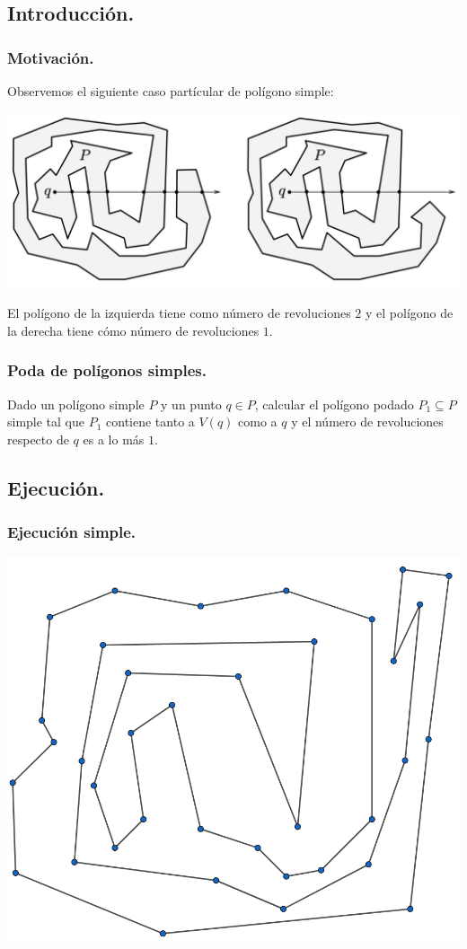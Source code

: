 \subsection{Introducción.}
\begin{frame}
  \frametitle{Motivación.}
  Observemos el siguiente caso partícular de polígono simple:
  
  \begin{center} \includegraphics[width=0.55 \paperwidth]{images/Revoluciones.png} \end{center}

  El polígono de la izquierda tiene como número de revoluciones $2$ y el polígono
  de la derecha tiene cómo número de revoluciones $1$.
\end{frame}

\begin{frame}
  \frametitle{Poda de polígonos simples.}
  Dado un polígono simple $P$ y un punto $q \in P$, calcular el polígono podado $P_1 \subseteq P$
  simple tal que $P_1$ contiene tanto a $V(q)$ como a $q$ y el número de revoluciones respecto de
  $q$ es a lo más $1$.  
\end{frame}

\subsection{Ejecución.}
\begin{frame}
  \frametitle{Ejecución simple.}
  \centering \includegraphics[width=0.45 \paperwidth]{images/Poda/1.png}
\end{frame}

